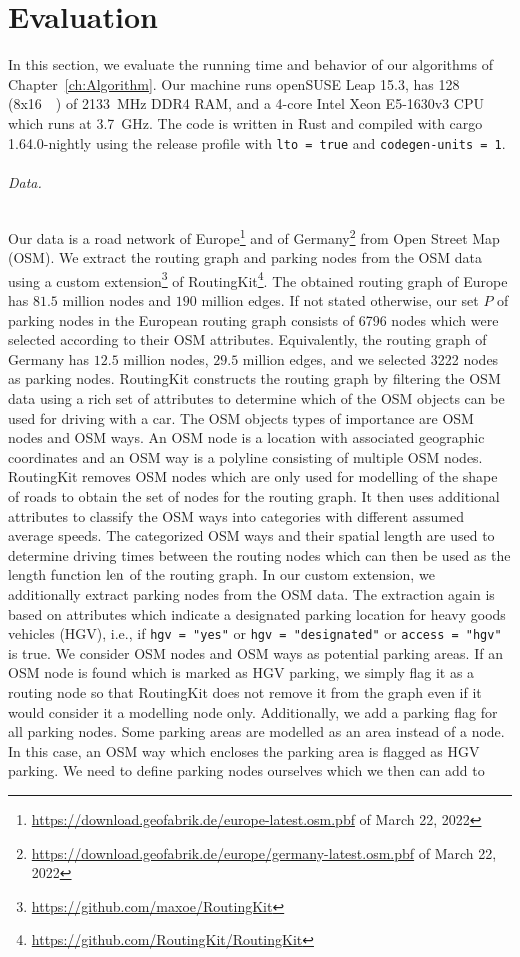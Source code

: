 
\chapter{Evaluation\label{ch:Evaluation}}
In this section, we evaluate the running time and behavior of our algorithms of Chapter~\ref{ch:Algorithm}. Our machine runs openSUSE Leap 15.3, has \SI{128}{\giga\byte} (8x\SI{16}{\giga\byte}) of \SI{2133}{\mega\hertz} DDR4 RAM, and a 4-core Intel Xeon E5-1630v3 CPU which runs at \SI{3.7}{\giga\hertz}. The code is written in Rust and compiled with cargo 1.64.0-nightly using the release profile with \texttt{lto~=~true} and \texttt{codegen-units~=~1}.

\subparagraph{Data.} Our data is a road network of Europe\footnote{\url{https://download.geofabrik.de/europe-latest.osm.pbf} of March 22, 2022} and of Germany\footnote{\url{https://download.geofabrik.de/europe/germany-latest.osm.pbf} of March 22, 2022} from Open Street Map (OSM). We extract the routing graph and parking nodes from the OSM data using a custom extension\footnote{\url{https://github.com/maxoe/RoutingKit}} of RoutingKit\footnote{\url{https://github.com/RoutingKit/RoutingKit}}. The obtained routing graph of Europe has $81.5$ million nodes and $190$ million edges. If not stated otherwise, our set $P$ of parking nodes in the European routing graph consists of \num{6796} nodes which were selected according to their OSM attributes. Equivalently, the routing graph of Germany has $12.5$ million nodes, $29.5$ million edges, and we selected \num{3222} nodes as parking nodes. RoutingKit constructs the routing graph by filtering the OSM data using a rich set of attributes to determine which of the OSM objects can be used for driving with a car. The OSM objects types of importance are OSM nodes and OSM ways. An OSM node is a location with associated geographic coordinates and an OSM way is a polyline consisting of multiple OSM nodes. RoutingKit removes OSM nodes which are only used for modelling of the shape of roads to obtain the set of nodes for the routing graph. It then uses additional attributes to classify the OSM ways into categories with different assumed average speeds. The categorized OSM ways and their spatial length are used to determine driving times between the routing nodes which can then be used as the length function $\operatorname{len}$ of the routing graph. In our custom extension, we additionally extract parking nodes from the OSM data. The extraction again is based on attributes which indicate a designated parking location for heavy goods vehicles (HGV), i.e., if \texttt{hgv = "yes"} or \texttt{hgv = "designated"} or \texttt{access = "hgv"} is true. We consider OSM nodes and OSM ways as potential parking areas. If an OSM node is found which is marked as HGV parking, we simply flag it as a routing node so that RoutingKit does not remove it from the graph even if it would consider it a modelling node only. Additionally, we add a parking flag for all parking nodes. Some parking areas are modelled as an area instead of a node. In this case, an OSM way which encloses the parking area is flagged as HGV parking. We need to define parking nodes ourselves which we then can add to 
